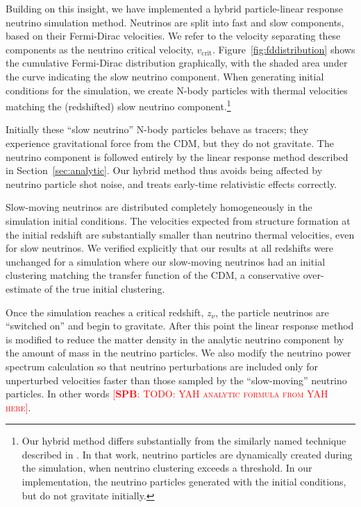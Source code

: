 \documentclass[useAMS, usenatbib]{mnras}
\newcommand{\spb}[1]{{\textsc{\textcolor{red}{[{\bf SPB}: #1]}}}}
\begin{document}
Building on this insight, we have implemented a hybrid particle-linear response neutrino simulation method. Neutrinos are split into fast and slow components, based on their Fermi-Dirac velocities. We refer to the velocity separating these components as the neutrino critical velocity, $v_\mathrm{crit}$. Figure~\ref{fig:fddistribution} shows the cumulative Fermi-Dirac distribution graphically, with the shaded area under the curve indicating the slow neutrino component. When generating initial conditions for the simulation, we create N-body particles with thermal velocities matching the (redshifted) slow neutrino component.\footnote{Our hybrid method differs substantially from the similarly named technique described in \cite{Brandbyge_2010}. In that work, neutrino particles are dynamically created during the simulation, when neutrino clustering exceeds a threshold. In our implementation, the neutrino particles generated with the initial conditions, but do not gravitate initially.}

Initially these ``slow neutrino'' N-body particles behave as tracers; they experience gravitational force from the CDM, but they do not gravitate. The neutrino component is followed entirely by the linear response method described 
in Section~\ref{sec:analytic}. Our hybrid method thus avoids being affected by neutrino particle shot noise, and treats early-time relativistic effects correctly.

Slow-moving neutrinos are distributed completely homogeneously in the simulation initial conditions. The velocities expected from structure formation at the initial redshift are substantially smaller than neutrino thermal velocities, even for slow neutrinos. 
We verified explicitly that our results at all redshifts were unchanged for a simulation where our slow-moving neutrinos had an initial clustering matching the transfer function of the CDM, a conservative over-estimate of the true initial clustering.

Once the simulation reaches a critical redshift, $z_\nu$, the particle neutrinos are ``switched on'' and begin to gravitate.
After this point the linear response method is modified to reduce the matter density in the analytic neutrino component by the amount of mass in the neutrino particles. We also modify the neutrino power spectrum calculation so that neutrino perturbations are included only for unperturbed velocities faster than those sampled by the ``slow-moving'' neutrino particles. 
In other words \spb{TODO: YAH analytic formula from YAH here}.
\end{document}
